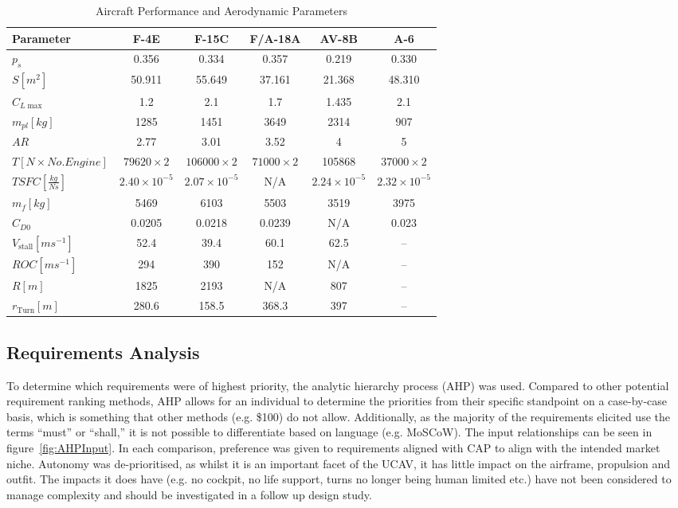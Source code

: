 \documentclass[../main.tex]{subfiles}
\begin{document}
\begin{table}[htbp]
    \centering
        \caption{Aircraft Performance and Aerodynamic Parameters}
    \label{tab:aircraft_parameters}
    \begin{tabular}{lccccc}
        \hline
        Parameter & F-4E & F-15C & F/A-18A & AV-8B & A-6 \\
        \hline
        $p_{s}$      & 0.356 & 0.334 & 0.357 & 0.219 & 0.330 \\
        $S \left[m^{2}\right]$       & 50.911 & 55.649 & 37.161 & 21.368 & 48.310 \\
        $C_{L\max}$ & 1.2 & 2.1 & 1.7 & 1.435 & 2.1 \\
        $m_{pl} \left[kg\right]$     & 1285 & 1451 & 3649 & 2314 & 907 \\
        $AR$      & 2.77 & 3.01 & 3.52 & 4 & 5 \\
        $T\left[N \times No.Engine\right]$       & $79620 \times 2$ & $106000 \times 2$ & $71000 \times 2$ & 105868 & $37000 \times 2$ \\
        $TSFC\left[\frac{kg}{Ns}\right]$    & $2.40\times10^{-5}$ & $2.07\times10^{-5}$ & N/A & $2.24\times10^{-5}$ & $2.32\times10^{-5}$ \\
        $m_f \left[kg\right]$     & 5469 & 6103 & 5503 & 3519 & 3975 \\
        $C_{D0}$  & 0.0205 & 0.0218 & 0.0239 & N/A & 0.023 \\
        $V_{\text{stall}} \left[ms^{-1}\right]$ & 52.4 & 39.4 & 60.1 & 62.5 & -- \\
        $ROC\left[ms^{-1}\right]$     & 294 & 390 & 152 & N/A & -- \\
        $R\left[m\right]$       & 1825 & 2193 & N/A & 807 & -- \\
        $r_{\text{Turn}}\left[m\right]$ & 280.6 & 158.5 & 368.3 & 397 & -- \\
        \hline
    \end{tabular}
\end{table}

\subsection{Requirements Analysis} \label{reqrank}
To determine which requirements were of highest priority, the analytic hierarchy process (AHP) was used.
Compared to other potential requirement ranking methods, AHP allows for an individual to determine the priorities from their specific standpoint on a case-by-case basis, which is something that other methods (e.g. \$100) do not allow. Additionally, as the majority of the requirements elicited use the terms ``must'' or ``shall,'' it is not possible to differentiate based on language (e.g. MoSCoW).
The input relationships can be seen in figure~\ref{fig:AHPInput}.
In each comparison, preference was given to requirements aligned with CAP to align with the intended market niche.
Autonomy was de-prioritised, as whilst it is an important facet of the UCAV, it has little impact on the airframe, propulsion and outfit.
The impacts it does have (e.g. no cockpit, no life support, turns no longer being human limited etc.) have not been considered to manage complexity and should be investigated in a follow up design study.
\end{document}
